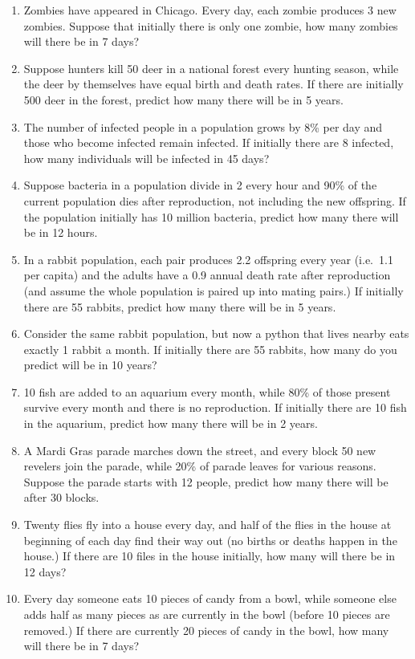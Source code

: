 \documentclass[
  letterpaper,
  DIV=11,
  numbers=noendperiod]{scrreprt}
\begin{document}
\begin{enumerate}
\def\labelenumi{\arabic{enumi}.}
\item
  Zombies have appeared in Chicago. Every day, each zombie produces 3
  new zombies. Suppose that initially there is only one zombie, how many
  zombies will there be in 7 days?
\item
  Suppose hunters kill 50 deer in a national forest every hunting
  season, while the deer by themselves have equal birth and death rates.
  If there are initially 500 deer in the forest, predict how many there
  will be in 5 years.
\item
  The number of infected people in a population grows by 8\% per day and
  those who become infected remain infected. If initially there are 8
  infected, how many individuals will be infected in 45 days?
\item
  Suppose bacteria in a population divide in 2 every hour and 90\% of
  the current population dies after reproduction, not including the new
  offspring. If the population initially has 10 million bacteria,
  predict how many there will be in 12 hours.
\item
  In a rabbit population, each pair produces 2.2 offspring every year
  (i.e.~1.1 per capita) and the adults have a 0.9 annual death rate
  after reproduction (and assume the whole population is paired up into
  mating pairs.) If initially there are 55 rabbits, predict how many
  there will be in 5 years.
\item
  Consider the same rabbit population, but now a python that lives
  nearby eats exactly 1 rabbit a month. If initially there are 55
  rabbits, how many do you predict will be in 10 years?
\item
  10 fish are added to an aquarium every month, while 80\% of those
  present survive every month and there is no reproduction. If initially
  there are 10 fish in the aquarium, predict how many there will be in 2
  years.
\item
  A Mardi Gras parade marches down the street, and every block 50 new
  revelers join the parade, while 20\% of parade leaves for various
  reasons. Suppose the parade starts with 12 people, predict how many
  there will be after 30 blocks.
\item
  Twenty flies fly into a house every day, and half of the flies in the
  house at beginning of each day find their way out (no births or deaths
  happen in the house.) If there are 10 files in the house initially,
  how many will there be in 12 days?
\item
  Every day someone eats 10 pieces of candy from a bowl, while someone
  else adds half as many pieces as are currently in the bowl (before 10
  pieces are removed.) If there are currently 20 pieces of candy in the
  bowl, how many will there be in 7 days?
\end{enumerate}
\end{document}
